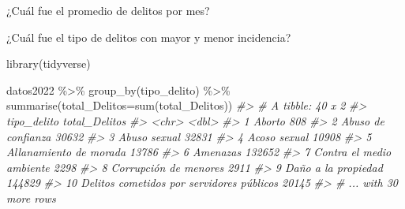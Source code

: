 \documentclass[
]{book}
\newenvironment{Shaded}{\begin{snugshade}}{\end{snugshade}}
\newcommand{\AttributeTok}[1]{\textcolor[rgb]{0.77,0.63,0.00}{#1}}
\newcommand{\CommentTok}[1]{\textcolor[rgb]{0.56,0.35,0.01}{\textit{#1}}}
\newcommand{\FunctionTok}[1]{\textcolor[rgb]{0.00,0.00,0.00}{#1}}
\newcommand{\NormalTok}[1]{#1}
\newcommand{\OtherTok}[1]{\textcolor[rgb]{0.56,0.35,0.01}{#1}}
\newcommand{\SpecialCharTok}[1]{\textcolor[rgb]{0.00,0.00,0.00}{#1}}
\newcommand{\StringTok}[1]{\textcolor[rgb]{0.31,0.60,0.02}{#1}}
\begin{document}
¿Cuál fue el promedio de delitos por mes?

\begin{Shaded}
\end{Shaded}

\begin{Shaded}
\end{Shaded}

¿Cuál fue el tipo de delitos con mayor y menor incidencia?

\begin{Shaded}
\begin{Highlighting}[]
\FunctionTok{library}\NormalTok{(tidyverse)}

\NormalTok{datos2022 }\SpecialCharTok{\%\textgreater{}\%} 
  \FunctionTok{group\_by}\NormalTok{(tipo\_delito) }\SpecialCharTok{\%\textgreater{}\%} 
  \FunctionTok{summarise}\NormalTok{(}\AttributeTok{total\_Delitos=}\FunctionTok{sum}\NormalTok{(total\_Delitos))}
\CommentTok{\#\textgreater{} \# A tibble: 40 x 2}
\CommentTok{\#\textgreater{}    tipo\_delito                               total\_Delitos}
\CommentTok{\#\textgreater{}    \textless{}chr\textgreater{}                                             \textless{}dbl\textgreater{}}
\CommentTok{\#\textgreater{}  1 Aborto                                              808}
\CommentTok{\#\textgreater{}  2 Abuso de confianza                                30632}
\CommentTok{\#\textgreater{}  3 Abuso sexual                                      32831}
\CommentTok{\#\textgreater{}  4 Acoso sexual                                      10908}
\CommentTok{\#\textgreater{}  5 Allanamiento de morada                            13786}
\CommentTok{\#\textgreater{}  6 Amenazas                                         132652}
\CommentTok{\#\textgreater{}  7 Contra el medio ambiente                           2298}
\CommentTok{\#\textgreater{}  8 Corrupción de menores                              2911}
\CommentTok{\#\textgreater{}  9 Daño a la propiedad                              144829}
\CommentTok{\#\textgreater{} 10 Delitos cometidos por servidores públicos         20145}
\CommentTok{\#\textgreater{} \# ... with 30 more rows}
\end{Highlighting}
\end{Shaded}
\end{document}

